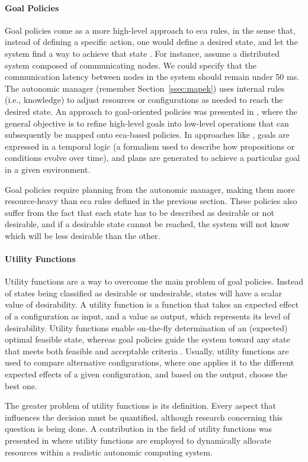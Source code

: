 \paragraph{Goal Policies}
\label{par:goalpolicies}
Goal policies come as a more high-level approach to \gls{eca} rules, in the sense that, instead of defining a specific action, one would define a desired state, and let the system find a way to achieve that state \cite{Huebscher2008}. For instance, assume a distributed system composed of communicating nodes. We could specify that the communication latency between nodes in the system should remain under 50 ms. The autonomic manager (remember Section~\ref{ssec:mapek}) uses internal rules (i.e., knowledge) to adjust resources or configurations as needed to reach the desired state. An approach to goal-oriented policies was presented in \cite{Bandara2004}, where the general objective is to refine high-level goals into low-level operations that can subsequently be mapped onto \gls{eca}-based policies. In approaches like \cite{Sykes2008}, goals are expressed in a temporal logic (a formalism used to describe how propositions or conditions evolve over time),
 and plans are generated to achieve a particular goal in a given environment. 
\par Goal policies require planning from the autonomic manager, making them more resource-heavy than \gls{eca} rules defined in the previous section. These policies also suffer from the fact that each state has to be described as desirable or not desirable, and if a desirable state cannot be reached, the system will not know which will be less desirable than the other.
%
%
%
\paragraph{Utility Functions}
\label{par:utilityfunctions}
Utility functions are a way to overcome the main problem of goal policies. Instead of states being classified as desirable or undesirable, states will have a scalar value of desirability. A utility function is a function that takes an expected effect of a configuration as input, and a value as output, which represents its level of desirability. Utility functions enable on-the-fly determination of an (expected) optimal feasible state, whereas goal policies guide the system toward any state that meets both feasible and acceptable criteria \cite{Walsh2004}. Usually, utility functions are used to compare alternative  configurations, where one applies it to the different expected effects of a given configuration, and based on the output, choose the best one.%
\par The greater problem of utility functions is its definition. Every aspect that influences the decision must be quantified, although research concerning this question is being done. A contribution in the field of utility functions was presented in \cite{Walsh2004} where utility functions are employed to dynamically allocate resources within a realistic autonomic computing system.
%
%
%
